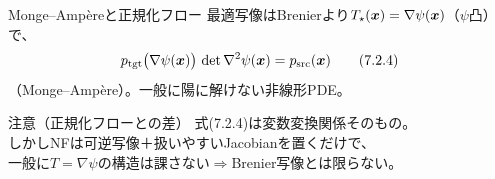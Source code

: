 \begin{frame}{Monge--Ampèreと正規化フロー}
    最適写像はBrenierより$T_{\star}(\bm{x})=\nabla\psi(\bm{x})$（$\psi$凸）で、
    \[
        p_{\mathrm{tgt}}\bigl(\nabla\psi(\bm{x})\bigr)\,
        \det\nabla^{2}\psi(\bm{x})
        =
        p_{\mathrm{src}}(\bm{x})
        \tag{7.2.4}
    \]
    （Monge--Ampère）。一般に陽に解けない非線形PDE。
    \begin{alertblock}{注意（正規化フローとの差）}
        式(7.2.4)は変数変換関係そのもの。\\
        しかしNFは可逆写像＋扱いやすいJacobianを置くだけで、\\
        一般に$T=\nabla\psi$の構造は課さない$\Rightarrow$Brenier写像とは限らない。
    \end{alertblock}
\end{frame}
